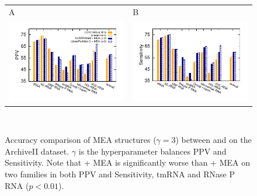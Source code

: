 \iftrue
\begin{figure}[h]
  \centering
\begin{tabular}{ll}
{\large\sf A} & {\large\sf B}\\[-1cm]
    \includegraphics[width=.45\textwidth]{figs/MEA_vs_MFE_PPV_LPC}
    &
    \hspace{-0.1cm}
    \includegraphics[width=.45\textwidth]{figs/MEA_vs_MFE_sens_LPC}
  \end{tabular} \\[-0.5cm]
  \caption{Accuracy comparison of MEA structures ($\gamma=3$) between \contrafold and \linearpartitionc on the ArchiveII dataset. 
  $\gamma$ is the hyperparameter balances PPV and Sensitivity. Note that \linearpartitionc + MEA is significantly worse than \contrafold + MEA on two families in both PPV and Sensitivity, tmRNA and RNase P RNA ($p < 0.01$).
  \label{fig:mea_lpc}}
\end{figure}
\fi


